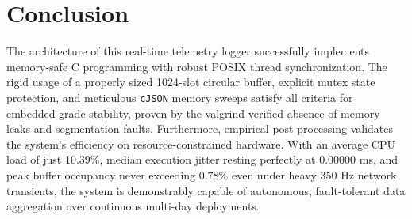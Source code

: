 \documentclass[12pt,a4paper]{article}
\begin{document}
\section{Conclusion}
The architecture of this real-time telemetry logger successfully implements memory-safe C programming with robust POSIX thread synchronization. The rigid usage of a properly sized 1024-slot circular buffer, explicit mutex state protection, and meticulous \texttt{cJSON} memory sweeps satisfy all criteria for embedded-grade stability, proven by the valgrind-verified absence of memory leaks and segmentation faults. Furthermore, empirical post-processing validates the system's efficiency on resource-constrained hardware. With an average CPU load of just 10.39\%, median execution jitter resting perfectly at 0.00000 ms, and peak buffer occupancy never exceeding 0.78\% even under heavy 350 Hz network transients, the system is demonstrably capable of autonomous, fault-tolerant data aggregation over continuous multi-day deployments.
\end{document}

